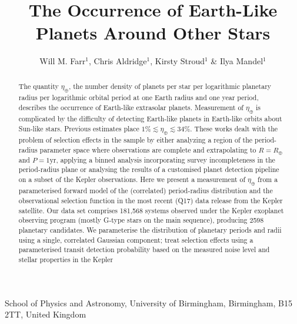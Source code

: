 \documentclass{nature}
\newcommand{\etaearth}{\eta_\oplus}
\newcommand{\REarth}{R_\oplus}
\begin{document}
\title{The Occurrence of Earth-Like Planets Around Other Stars}

\author{Will M. Farr$^{1}$, Chris Aldridge$^{1}$, Kirsty Stroud$^{1}$ \& Ilya Mandel$^{1}$}

\maketitle

\begin{affiliations}
\item School of Physics and Astronomy, University of Birmingham, Birmingham, B15 2TT, United Kingdom
\end{affiliations}

\begin{abstract}
  The quantity $\etaearth$, the number density of planets per star per
  logarithmic planetary radius per logarithmic orbital period at one
  Earth radius and one year period, describes the occurrence of
  Earth-like extrasolar planets.  Measurement of $\etaearth$ is
  complicated by the difficulty of detecting Earth-like planets in
  Earth-like orbits about Sun-like stars.  Previous
  estimates\cite{Catanzarite2011,Traub2012,Dong2013,Petigura2013,Foreman-Mackey2014}
  place $1\% \lesssim \etaearth \lesssim 34\%$.  These works dealt
  with the problem of selection effects in the sample by either
  analyzing a region of the period-radius parameter space where
  observations are complete and extrapolating to $R = \REarth$ and $P
  = 1 \mathrm{yr}$\cite{Catanzarite2011,Traub2012}, applying a binned
  analysis incorporating survey incompleteness in the period-radius
  plane\cite{Dong2013,Petigura2013} or analysing the results of a
  customised planet detection pipeline on a subset of the Kepler
  observations\cite{Petigura2013,Foreman-Mackey2014}.  Here we present
  a measurement of $\etaearth$ from a parameterised forward model of the
  (correlated) period-radius distribution and the observational
  selection function in the most recent (Q17) data release from the
  Kepler satellite\cite{Borucki2010,Borucki2011,Batalha2013}.  Our
  data set comprises 181,568 systems observed under the Kepler
  exoplanet observing program (mostly G-type stars on the main
  sequence\cite{Batalha2010}), producing 2598 planetary candidates.
  We parameterise the distribution of planetary periods and radii
  using a single, correlated Gaussian component; treat selection
  effects using a parameterised transit detection probability based on
  the measured noise level and stellar properties in the Kepler

\end{abstract}
\end{document}
